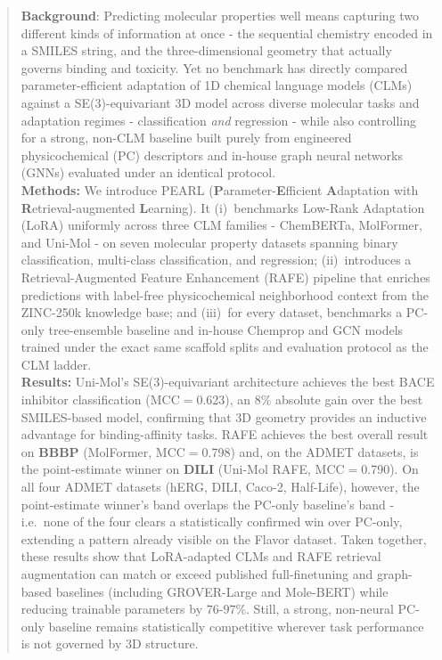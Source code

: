 \documentclass[final,1p,times]{elsarticle}
\begin{document}
\begin{frontmatter}
\begin{abstract}
\textbf{Background}: Predicting molecular properties well means capturing two different kinds of information at once - the sequential chemistry encoded in a SMILES string, and the three-dimensional geometry that actually governs binding and toxicity. Yet no benchmark has directly compared parameter-efficient adaptation of 1D chemical language models (CLMs) against a SE(3)-equivariant 3D model across diverse molecular tasks and adaptation regimes - classification \emph{and} regression - while also controlling for a strong, non-CLM baseline built purely from engineered physicochemical (PC) descriptors and in-house graph neural networks (GNNs) evaluated under an identical protocol.\\
\textbf{Methods:} We introduce PEARL (\textbf{P}arameter-\textbf{E}fficient \textbf{A}daptation with \textbf{R}etrieval-augmented \textbf{L}earning). It (i)~benchmarks Low-Rank Adaptation (LoRA) uniformly across three CLM families - ChemBERTa, MolFormer, and Uni-Mol - on seven molecular property datasets spanning binary classification, multi-class classification, and regression; (ii)~introduces a Retrieval-Augmented Feature Enhancement (RAFE) pipeline that enriches predictions with label-free physicochemical neighborhood context from the ZINC-250k knowledge base; and (iii)~for every dataset, benchmarks a PC-only tree-ensemble baseline and in-house Chemprop and GCN models trained under the exact same scaffold splits and evaluation protocol as the CLM ladder.\\
\textbf{Results:} Uni-Mol's SE(3)-equivariant architecture achieves the best BACE inhibitor classification (MCC$=$0.623), an $8\%$ absolute gain over the best SMILES-based model, confirming that 3D geometry provides an inductive advantage for binding-affinity tasks. RAFE achieves the best overall result on \textbf{BBBP} (MolFormer, MCC$=$0.798) and, on the ADMET datasets, is the point-estimate winner on \textbf{DILI} (Uni-Mol RAFE, MCC$=$0.790). %
On all four ADMET datasets (hERG, DILI, Caco-2, Half-Life), however, the point-estimate winner's band overlaps the PC-only baseline's band - i.e.\ none of the four clears a statistically confirmed win over PC-only, extending a pattern already visible on the Flavor dataset. Taken together, these results show that LoRA-adapted CLMs and RAFE retrieval augmentation can match or exceed published full-finetuning and graph-based baselines (including GROVER-Large and Mole-BERT) while reducing trainable parameters by $76$-$97\%$. Still, a strong, non-neural PC-only baseline remains statistically competitive wherever task performance is not governed by 3D structure.


\end{abstract}
\end{frontmatter}
\end{document}

